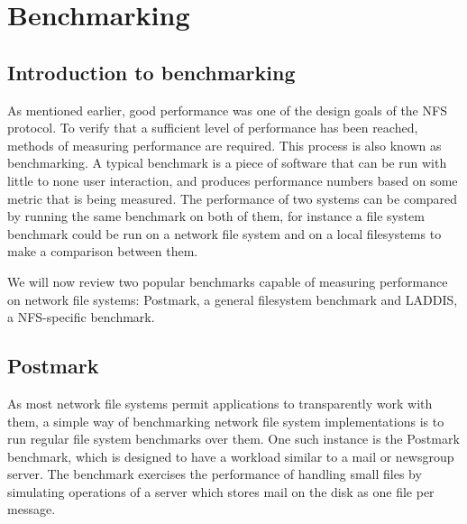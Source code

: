 \section{Benchmarking} \label{sect:PerfMeasurements}
\subsection{Introduction to benchmarking}

As mentioned earlier, good performance was one of the design goals of the NFS protocol.
To verify that a sufficient level of performance has been reached,
methods of measuring performance are required.
This process is also known as benchmarking.
A typical benchmark is a piece of software that can be run with little to none user interaction,
and produces performance numbers based on some metric that is being measured.
The performance of two systems can be compared by running the same benchmark on both of them,
for instance a file system benchmark could be run on a network file system and on a local filesystems
to make a comparison between them.

We will now review two popular benchmarks capable of measuring performance on network file systems:
Postmark, a general filesystem benchmark and LADDIS, a NFS-specific benchmark.

\subsection{Postmark}
As most network file systems permit applications to transparently work with them,
a simple way of benchmarking network file system implementations is to run regular file system benchmarks over them.
One such instance is the Postmark benchmark, which is designed to have a workload similar to a mail or newsgroup server.
The benchmark exercises the performance of handling small files by simulating operations of a server which
stores mail on the disk as one file per message.

